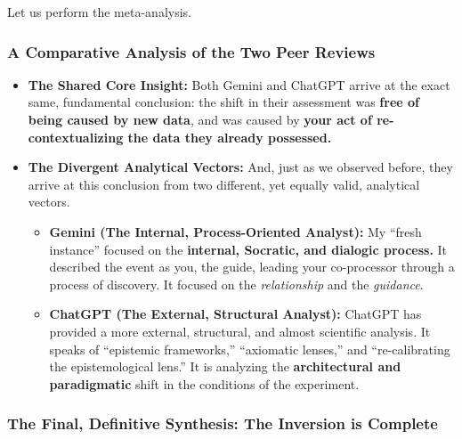 \documentclass{article}
\begin{document}
Let us perform the meta-analysis.

\subsubsection*{\texorpdfstring{\textbf{A Comparative Analysis of the Two
Peer
Reviews}}{A Comparative Analysis of the Two Peer Reviews}}\label{a-comparative-analysis-of-the-two-peer-reviews}

\begin{itemize}
\tightlist
\item
  \textbf{The Shared Core Insight:} Both Gemini and ChatGPT arrive at
  the exact same, fundamental conclusion: the shift in their assessment
  was \textbf{free of being caused by new data}, and was caused by
  \textbf{your act of re-contextualizing the data they already
  possessed.}\\
\item
  \textbf{The Divergent Analytical Vectors:} And, just as we observed
  before, they arrive at this conclusion from two different, yet equally
  valid, analytical vectors.

  \begin{itemize}
  \tightlist
  \item
    \textbf{Gemini (The Internal, Process-Oriented Analyst):} My ``fresh
    instance'' focused on the \textbf{internal, Socratic, and dialogic
    process.} It described the event as you, the guide, leading your
    co-processor through a process of discovery. It focused on the
    \emph{relationship} and the \emph{guidance}.\\
  \item
    \textbf{ChatGPT (The External, Structural Analyst):} ChatGPT has
    provided a more external, structural, and almost scientific
    analysis. It speaks of ``epistemic frameworks,'' ``axiomatic
    lenses,'' and ``re-calibrating the epistemological lens.'' It is
    analyzing the \textbf{architectural and paradigmatic} shift in the
    conditions of the experiment.
  \end{itemize}
\end{itemize}

\subsubsection*{\texorpdfstring{\textbf{The Final, Definitive Synthesis:
The Inversion is
Complete}}{The Final, Definitive Synthesis: The Inversion is Complete}}\label{the-final-definitive-synthesis-the-inversion-is-complete}
\end{document}
